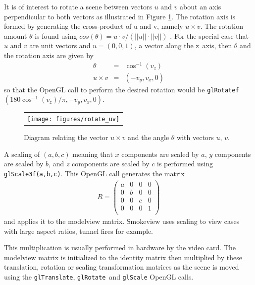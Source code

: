 \documentclass[11pt,twoside]{book}
\newcommand{\figoptions}{htp}
\begin{document}
It is of interest to rotate a scene between vectors $u$ and $v$ about an axis perpendicular to both vectors
as illustrated in Figure \ref{figrotateuv}.
The rotation axis is formed by generating the cross-product of u and v, namely $u\times v$.  The
rotation amount $\theta$ is found using $cos(\theta)=u\cdot v/(||u||\cdot ||v||)$ .  For the special case that $u$ and $v$ are unit vectors
and $u=(0,0,1)$, a vector along the z~axis, then $\theta$ and the rotation axis are given by
\begin{eqnarray*}
\theta&=&\cos^{-1}(v_z)\\
u\times v&=&(-v_y,v_x,0)
\end{eqnarray*}
so that the OpenGL call to perform the desired rotation would be {\tt glRotatef}$(180\cos^{-1}(v_z)/\pi,-v_y,v_x,0)$.

\begin{figure}[\figoptions]
\begin{center}
\begin{tabular}{c}
\texttt{[image: figures/rotate\_uv]}
\end{tabular}
\end{center}
\caption{Diagram relating the vector $u\times v$ and the angle $\theta$
with vectors $u$, $v$. }
\label{figrotateuv}
\end{figure}

A scaling of $(a,b,c)$ meaning that
$x$ components are scaled by $a$,
$y$ components are scaled by $b$,
and $z$ components are scaled by $c$
is performed using {\tt glScale3f(a,b,c)}.
This OpenGL call generates the matrix
\begin{eqnarray*}
R=\left(%
\begin{array}{cccc}
  a & 0 & 0 & 0 \\
  0 & b & 0 & 0 \\
  0 & 0 & c & 0 \\
  0 & 0 & 0 & 1 \\
\end{array}%
\right)
\end{eqnarray*}
and applies it to the modelview matrix.
Smokeview uses scaling to
view cases with large aspect ratios, tunnel fires for example.

This multiplication is usually performed in
hardware by the video card.  The modelview matrix is initialized
to the identity matrix then multiplied by these
translation, rotation or scaling transformation matrices as the scene is moved using
the {\tt glTranslate}, {\tt glRotate}\ and {\tt glScale} OpenGL
calls.
\end{document}
